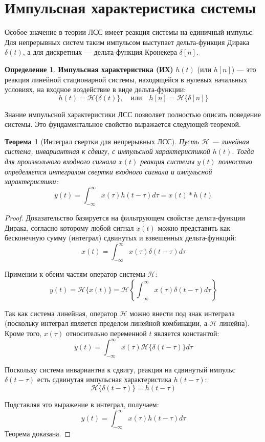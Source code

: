 \documentclass[a4paper, 12pt]{article}
\theoremstyle{definition}
\newtheorem{definition}{Определение}
\theoremstyle{plain}
\newtheorem{theorem}{Теорема}
\begin{document}
\section{Импульсная характеристика системы}

Особое значение в теории ЛСС имеет реакция системы на единичный импульс. Для непрерывных систем таким импульсом выступает дельта-функция Дирака $\delta(t)$, а для дискретных — дельта-функция Кронекера $\delta[n]$.

\begin{definition}
\textbf{Импульсная характеристика (ИХ)} $h(t)$ (или $h[n]$) — это реакция линейной стационарной системы, находящейся в нулевых начальных условиях, на входное воздействие в виде дельта-функции:
$$ h(t) = \mathcal{H}\{\delta(t)\}, \quad \text{или} \quad h[n] = \mathcal{H}\{\delta[n]\} $$
\end{definition}

Знание импульсной характеристики ЛСС позволяет полностью описать поведение системы. Это фундаментальное свойство выражается следующей теоремой.

\begin{theorem}[Интеграл свертки для непрерывных ЛСС]
Пусть $\mathcal{H}$ — линейная система, инвариантная к сдвигу, с импульсной характеристикой $h(t)$. Тогда для произвольного входного сигнала $x(t)$ реакция системы $y(t)$ полностью определяется интегралом свертки входного сигнала и импульсной характеристики:
$$ y(t) = \int_{-\infty}^{\infty} x(\tau) h(t - \tau) d\tau = x(t) * h(t) $$
\end{theorem}

\begin{proof}
Доказательство базируется на фильтрующем свойстве дельта-функции Дирака, согласно которому любой сигнал $x(t)$ можно представить как бесконечную сумму (интеграл) сдвинутых и взвешенных дельта-функций:
$$ x(t) = \int_{-\infty}^{\infty} x(\tau) \delta(t - \tau) d\tau $$

Применим к обеим частям оператор системы $\mathcal{H}$:
$$ y(t) = \mathcal{H}\{x(t)\} = \mathcal{H}\left\{ \int_{-\infty}^{\infty} x(\tau) \delta(t - \tau) d\tau \right\} $$

Так как система линейная, оператор $\mathcal{H}$ можно внести под знак интеграла (поскольку интеграл является пределом линейной комбинации, а $\mathcal{H}$ линейна). Кроме того, $x(\tau)$ относительно переменной $t$ является константой:
$$ y(t) = \int_{-\infty}^{\infty} x(\tau) \mathcal{H}\{\delta(t - \tau)\} d\tau $$

Поскольку система инвариантна к сдвигу, реакция на сдвинутый импульс $\delta(t - \tau)$ есть сдвинутая импульсная характеристика $h(t - \tau)$:
$$ \mathcal{H}\{\delta(t - \tau)\} = h(t - \tau) $$

Подставляя это выражение в интеграл, получаем:
$$ y(t) = \int_{-\infty}^{\infty} x(\tau) h(t - \tau) d\tau $$
Теорема доказана.
\end{proof}
\end{document}
